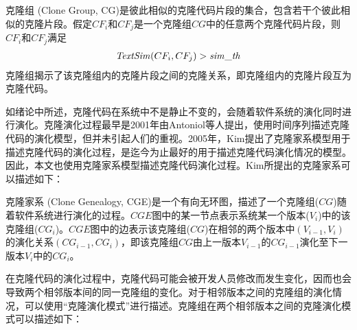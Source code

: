 \begin{definition}[克隆组]
\label {def-clonegroup}
克隆组 (Clone Group, CG)是彼此相似的克隆代码片段的集合，包含若干个彼此相似的克隆片段。假定$CF_i$和$CF_j$是一个克隆组$CG$中的任意两个克隆代码片段，则$CF_i$和$CF_j$满足
  \[
  \begin{array}[t]{c}
    \mathit{TextSim}(CF_i, CF_j) > \mathit{sim\_th} \\
  \end{array}
  \]
克隆组揭示了该克隆组内的克隆片段之间的克隆关系，即克隆组内的克隆片段互为克隆代码。
\end {definition}

如绪论中所述，克隆代码在系统中不是静止不变的，会随着软件系统的演化同时进行演化。克隆演化过程最早是2001年由Antoniol等人提出，使用时间序列描述克隆代码的演化模型\cite{antoniol2001modeling}，但并未引起人们的重视。2005年，Kim提出了克隆家系模型用于描述克隆代码的演化过程，是迄今为止最好的用于描述克隆代码演化情况的模型\cite{kim2005empirical}。因此，本文也使用克隆家系模型描述克隆代码演化过程。Kim所提出的克隆家系可以描述如下：

\begin{definition}[克隆家系]
\label{def-clonegenealogy}
克隆家系 (Clone Genealogy, CGE)是一个有向无环图，描述了一个克隆组($CG$)随着软件系统进行演化的过程。$CGE$图中的某一节点表示系统某一个版本($V_i$)中的该克隆组($CG_i$)。$CGE$图中的边表示该克隆组($CG$)在相邻的两个版本中$(V_{i-1},V_i )$的演化关系$(CG_{i-1},CG_{i})$，即该克隆组$CG$由上一版本$V_{i-1}$的$CG_{i-1}$演化至下一版本$V_{i}$中的$CG_{i}$。
\end{definition} 

在克隆代码的演化过程中，克隆代码可能会被开发人员修改而发生变化，因而也会导致两个相邻版本间的同一克隆组的变化。对于相邻版本之间的克隆组的演化情况，可以使用“克隆演化模式”进行描述。克隆组在两个相邻版本之间的克隆演化模式可以描述如下：

